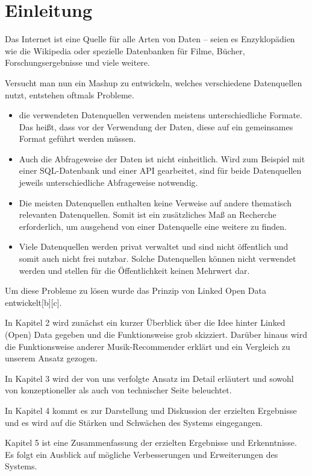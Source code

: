 \section{Einleitung}

Das Internet ist eine Quelle für alle Arten von Daten -- seien es Enzyklopädien wie die Wikipedia oder spezielle Datenbanken für Filme, Bücher, Forschungsergebnisse und viele weitere.


Versucht man nun ein Mashup zu entwickeln, welches verschiedene Datenquellen nutzt, entstehen oftmals Probleme.
\begin{itemize}
\item die verwendeten Datenquellen verwenden meistens unterschiedliche Formate. Das heißt, dass vor der Verwendung der Daten, diese auf ein gemeinsames Format geführt werden müssen.
\item Auch die Abfrageweise der Daten ist nicht einheitlich. Wird zum Beispiel mit einer SQL-Datenbank und einer API gearbeitet, sind für beide Datenquellen jeweils unterschiedliche Abfrageweise notwendig.
\item Die meisten Datenquellen enthalten keine Verweise auf andere thematisch relevanten Datenquellen. Somit ist ein zusätzliches Maß an Recherche erforderlich, um ausgehend von einer Datenquelle eine weitere zu finden.
\item Viele Datenquellen werden privat verwaltet und sind nicht öffentlich und somit auch nicht frei nutzbar. Solche Datenquellen können nicht verwendet werden und stellen für die Öffentlichkeit keinen Mehrwert dar.
\end{itemize}


Um diese Probleme zu lösen wurde das Prinzip von Linked Open Data entwickelt[b][c].


In Kapitel 2 wird zunächst ein kurzer Überblick über die Idee hinter Linked (Open) Data gegeben und die Funktionsweise grob skizziert. Darüber hinaus wird die Funktionsweise anderer Musik-Recommender erklärt und ein Vergleich zu unserem Ansatz gezogen.


In Kapitel 3 wird der von uns verfolgte Ansatz im Detail erläutert und sowohl von konzeptioneller als auch von technischer Seite beleuchtet.


In Kapitel 4 kommt es zur Darstellung und Diskussion der erzielten Ergebnisse und es wird auf die Stärken und Schwächen des Systems eingegangen.


Kapitel 5 ist eine Zusammenfassung der erzielten Ergebnisse und Erkenntnisse. Es folgt ein Ausblick auf mögliche Verbesserungen und Erweiterungen des Systems.